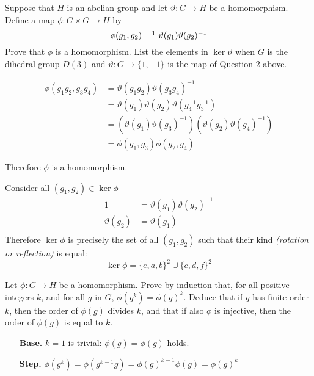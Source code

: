 \begin{exercise}
    Suppose that \(H\) is an abelian group and let \(\vartheta : G \to H\) be a homomorphism. Define a map \(\phi : G \times G \to H\) by
    \[\phi(g_1, g_2) =\!\footnotemark\ \vartheta(g_1)\vartheta(g_2)^{ - 1}\]
    Prove that \(\phi\) is a homomorphism. List the elements in \(\ker \vartheta\) when \(G\) is the dihedral group \(D(3)\) and \(\vartheta : G \to \{1, - 1\}\) is the map of Question 2 above.
\end{exercise}
\begin{solution}
    \begin{align*}
        \phi(g_1g_2, g_3g_4) & = \vartheta(g_1g_2)\vartheta(g_3g_4)^{ - 1}                                    \\
                             & = \vartheta(g_1)\vartheta(g_2)\vartheta(g_4^{ - 1}g_3^{ - 1})                  \\
                             & = (\vartheta(g_1) \vartheta(g_3)^{ - 1})(\vartheta(g_2) \vartheta(g_4)^{ - 1}) \\
                             & = \phi(g_1, g_3) \phi(g_2, g_4)
    \end{align*}

    Therefore \(\phi\) is a homomorphism.

    Consider all \((g_1, g_2) \in \ker \phi\)
    \begin{align*}
        1              & = \vartheta(g_1) \vartheta(g_2)^{ - 1} \\
        \vartheta(g_2) & = \vartheta(g_1)                       \\
    \end{align*}
    Therefore \(\ker \phi\) is precisely the set of all \((g_1, g_2)\) such that their kind \textit{(rotation or reflection)} is equal:
    \[\ker \phi = \{e, a, b\}^2 \cup \{c, d, f\}^2\]
\end{solution}

\begin{exercise}
    Let \(\phi : G \to H\) be a homomorphism. Prove by induction that, for all positive integers \(k\), and for all \(g\) in \(G\), \(\phi(g^k) = \phi(g)^k\). Deduce that if \(g\) has finite order \(k\), then the order of \(\phi(g)\) divides \(k\), and that if also \(\phi\) is injective, then the order of \(\phi(g)\) is equal to \(k\).
\end{exercise}
\begin{solution}\itemfix
    \begin{itemize}
        \item [\textbf{Base.}] \(k = 1\) is trivial: \(\phi(g) = \phi(g)\) holds.
        \item [\textbf{Step.}] \(\phi(g^k) = \phi(g^{k - 1}g) = \phi(g)^{k - 1}\phi(g) = \phi(g)^k\)
    \end{itemize}
\end{solution}

